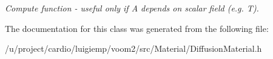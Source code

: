 \begin{DoxyCompactItemize}
\begin{DoxyCompactList}\small\item\em Compute function -\/ useful only if A depends on scalar field (e.g. T). \item\end{DoxyCompactList}\end{DoxyCompactItemize}


The documentation for this class was generated from the following file:\begin{DoxyCompactItemize}
\item 
/u/project/cardio/luigiemp/voom2/src/Material/DiffusionMaterial.h\end{DoxyCompactItemize}
